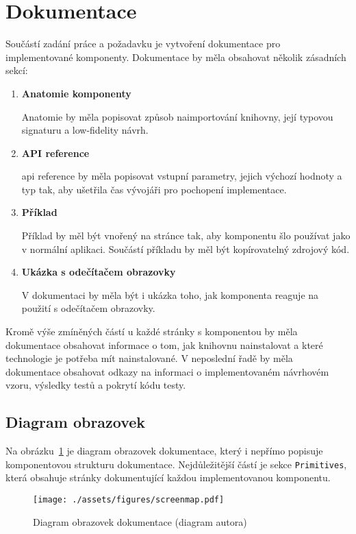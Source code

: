 \clearpage

\section{Dokumentace}

Součástí zadání práce a požadavku \hyperref[nfr14]{} je vytvoření dokumentace pro implementované komponenty.
Dokumentace by měla obsahovat několik zásadních sekcí:

\begin{enumerate}
    \item \textbf{Anatomie komponenty}

          Anatomie by měla popisovat způsob naimportování knihovny, její typovou signaturu a low-fidelity návrh.

    \item \textbf{API reference}

          \gls{api} reference by měla popisovat vstupní parametry, jejich výchozí hodnoty a typ tak, aby ušetřila čas vývojáři pro pochopení implementace.

    \item \textbf{Příklad}

          Příklad by měl být vnořený na stránce tak, aby komponentu šlo používat jako v normální aplikaci. Součástí příkladu by měl být kopírovatelný zdrojový kód.

    \item \textbf{Ukázka s odečítačem obrazovky}

          V dokumentaci by měla být i ukázka toho, jak komponenta reaguje na použití s odečítačem obrazovky.

\end{enumerate}

Kromě výše zmíněných částí u každé stránky s komponentou by měla dokumentace obsahovat informace o tom, jak knihovnu nainstalovat a které technologie je potřeba mít nainstalované.
V neposlední řadě by měla dokumentace obsahovat odkazy na informaci o implementovaném návrhovém vzoru, výsledky testů a pokrytí kódu testy.

\clearpage

\subsection{Diagram obrazovek}

Na obrázku~\ref{figure:screenmap} je diagram obrazovek dokumentace, který i nepřímo popisuje komponentovou strukturu dokumentace.
Nejdůležitější částí je sekce \texttt{Primitives}, která obsahuje stránky dokumentující každou implementovanou komponentu.

\begin{figure}[htp]
    \centering
    \texttt{[image: ./assets/figures/screenmap.pdf]}
    \captionsetup{justification=centering}
    \caption[Diagram obrazovek dokumentace]{Diagram obrazovek dokumentace (diagram autora)}
    \label{figure:screenmap}
\end{figure}
